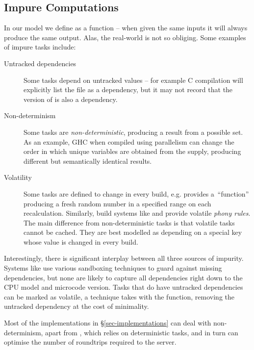 \subsection{Impure Computations}\label{sec-non-determinism}

In our model we define  as a function -- when given the same inputs
it will always produce the same output. Alas, the real-world is not so obliging.
Some examples of impure tasks include:

\begin{description}
\item[Untracked dependencies] Some tasks depend on untracked values -- for example
C compilation will explicitly list the  file as a dependency,
but it may not record that the version of  is also a dependency.

\item[Non-determinism] Some tasks are \emph{non-deterministic}, producing a
result from a possible set. As an example, GHC when compiled using parallelism
can change the order in which unique variables are obtained from the supply,
producing different but semantically identical results.

\item[Volatility] Some tasks are defined to change in every build, e.g. \Excel
provides a~``function''  producing a fresh random number in a
specified range on each recalculation. Similarly, build systems like \Make and
\Shake provide volatile \emph{phony rules}. The main difference from
non-deterministic tasks is that volatile tasks cannot be cached. They are best
modelled as depending on a special key  whose value is changed
in every build.
\end{description}

Interestingly, there is significant interplay between all three sources of
impurity. Systems like \Bazel use various sandboxing techniques to guard against
missing dependencies, but none are likely to capture all dependencies right down
to the CPU model and microcode version. Tasks that do have untracked
dependencies can be marked as volatile, a technique \Excel takes with the
 function, removing the untracked dependency at the cost of
minimality.

Most of the implementations in \S\ref{sec-implementations} can deal with
non-determinism, apart from \Buck, which relies on deterministic tasks, and
in turn can optimise the number of roundtrips required to the server.

